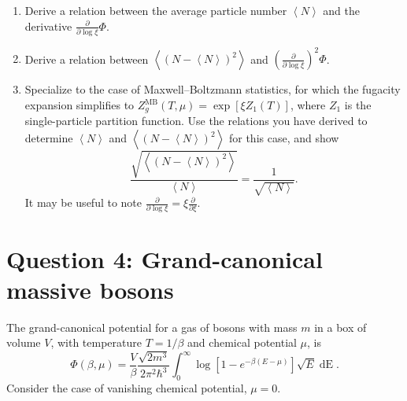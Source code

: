 \documentclass[12 pt]{article} %
\newcommand{\be}{\ensuremath{\beta} }
\renewcommand{\d}[1]{\ensuremath{\mathop{d#1}} }
\newcommand{\vev}[1]{\ensuremath{\left\langle #1 \right\rangle} }
\newcommand{\pderiv}[2]{\ensuremath{\frac{\partial #1}{\partial #2}} }
\newcommand{\showmarks}[1]{\rightline{\texttt{[#1 marks]}}} %
\begin{document}
\begin{enumerate}[label={(\alph*)}]
  \item Derive a relation between the average particle number $\vev{N}$ and the derivative $\displaystyle \pderiv{}{\log \xi}\Phi$.

  \showmarks{8}

  \item Derive a relation between $\vev{\left(N - \vev{N}\right)^2}$ and $\displaystyle \left(\pderiv{}{\log \xi}\right)^2 \Phi$.

  \showmarks{8}

  \item Specialize to the case of Maxwell--Boltzmann statistics, for which the fugacity expansion simplifies to $Z_g^{\text{MB}}(T, \mu) = \exp[\xi Z_1(T)]$, where $Z_1$ is the single-particle partition function.
        Use the relations you have derived to determine $\vev{N}$ and $\vev{\left(N - \vev{N}\right)^2}$ for this case, and show
        \begin{equation*}
          \frac{\sqrt{\vev{\left(N - \vev{N}\right)^2}}}{\vev{N}} = \frac{1}{\sqrt{\vev{N}}}.
        \end{equation*}
        It may be useful to note $\displaystyle \pderiv{}{\log \xi} = \xi \pderiv{}{\xi}$.

  \showmarks{8}
\end{enumerate}



\newpage
\section*{Question 4: Grand-canonical massive bosons}
The grand-canonical potential for a gas of bosons with mass $m$ in a box of volume $V$, with temperature $T = 1 / \be$ and chemical potential $\mu$, is
\begin{equation*} %
  \Phi(\be, \mu) = \frac{V}{\be} \frac{\sqrt{2m^3}}{2 \pi^2 \hbar^3} \int_0^{\infty} \log\left[1 - e^{-\be (E - \mu)}\right] \sqrt{E} \d{E}.
\end{equation*}
Consider the case of vanishing chemical potential, $\mu = 0$. %
\end{document}
